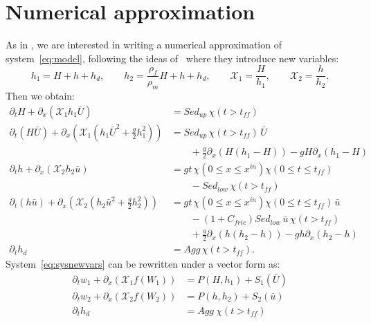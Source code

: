 \section{Numerical approximation}

As in \cite{Andrea}, we are interested in writing a numerical approximation of system~\eqref{eq:model}, following the ideas of~\cite{BerFouMor} where they introduce new variables:
\begin{equation*}
h_1 = H + h + h_d, \qquad
h_2 = \frac{\rho_f}{\rho_m} H + h + h_d, \qquad
\mathcal{X}_1 = \frac{H}{h_1}, \qquad
\mathcal{X}_2 = \frac{h}{h_2}.
\end{equation*}
Then we obtain:
\begin{subequations}
    \label{eq:sysnewvars}
    \begin{align}
    \partial_t H + \partial_x \left( \mathcal{X}_1 h_1 \bar{U}\right)& = Sed_{up} \, \chi(t > t_{f\!f})\\
    \partial_t \left( H \bar{U}\right) + \partial_x \left( \mathcal{X}_1 \left( h_1 \bar{U}^2 + \frac{g}{2} h_1^2\right) \right) & = Sed_{up} \, \chi(t > t_{f\!f}) \, \bar{U} \nonumber \\
    & \qquad + \frac{g}{2} \partial_x \left( H \left( h_1 - H\right)\right) - g H \partial_x (h_1 - H)\\
    \partial_t h + \partial_x \left( \mathcal{X}_2 h_2 \bar{u}\right) &= gt\, \chi( 0 \leq x \leq x^{in})\chi( 0 \leq t \leq t_{f\!f}) \nonumber \\
    & \qquad- Sed_{low} \, \chi(t > t_{f\!f})\\
    \partial_t \left( h \bar{u}\right) + \partial_x \left( \mathcal{X}_2 \left( h_2 \bar{u}^2 + \frac{g}{2} h_2^2\right) \right) &= gt\, \chi( 0 \leq x \leq x^{in})\chi( 0 \leq t \leq t_{f\!f}) \, \bar{u} \nonumber \\
    & \qquad- (1 + C_{fric})Sed_{low} \, \bar{u} \, \chi(t > t_{f\!f}) \nonumber\\
    &\qquad + \frac{g}{2} \partial_x \left( h \left( h_2 - h \right)\right) - g h \partial_x (h_2 - h)\\
    \partial_t h_d &= Agg \, \chi(t > t_{f\!f}).
\end{align}
\end{subequations}
System~\eqref{eq:sysnewvars} can be rewritten under a vector form as:
\begin{subequations}\label{eq:sysBert}
\begin{align}
 \partial_t w_1 + \partial_x \left( \mathcal{X}_1 f(W_1) \right) &= P(H,h_1) + S_1(\bar{U})\\
 \partial_t w_2 + \partial_x \left( \mathcal{X}_2 f(W_2) \right) &= P(h,h_2) + S_2(\bar{u})\\
 \partial_t h_d &= Agg \ \chi(t > t_{f\!f})
 \end{align}
\end{subequations}
